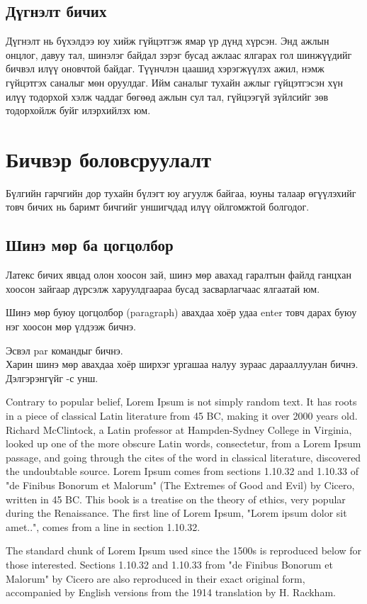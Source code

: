 \section{Дүгнэлт бичих}
Дүгнэлт нь бүхэлдээ юу хийж гүйцэтгэж ямар үр дүнд хүрсэн. Энд ажлын онцлог, давуу тал, шинэлэг байдал зэрэг бусад ажлаас ялгарах гол шинжүүдийг бичвэл илүү оновчтой байдаг. Түүнчлэн цаашид хэрэгжүүлэх ажил, нэмж гүйцэтгэх саналыг мөн оруулдаг. Ийм саналыг тухайн ажлыг гүйцэтгэсэн хүн илүү тодорхой хэлж чаддаг бөгөөд ажлын сул тал, гүйцээгүй зүйлсийг зөв тодорхойлж буйг илэрхийлэх юм.


\chapter{Бичвэр боловсруулалт}
Бүлгийн гарчгийн дор тухайн бүлэгт юу агуулж байгаа, юуны талаар өгүүлэхийг товч бичих нь баримт бичгийг уншигчдад илүү ойлгомжтой болгодог.
\section{Шинэ мөр ба цогцолбор}
Латекс бичих явцад олон хоосон зай, шинэ мөр авахад гаралтын файлд ганцхан хоосон зайгаар дүрсэлж харуулдгаараа бусад засварлагчаас ялгаатай юм.

Шинэ мөр буюу цогцолбор (paragraph) авахдаа хоёр удаа enter товч дарах буюу нэг хоосон мөр үлдээж бичнэ. \par Эсвэл par командыг бичнэ.
\\Харин шинэ мөр авахдаа хоёр ширхэг ургашаа налуу зураас дарааллуулан бичнэ.  Дэлгэрэнгүйг \cite{pharagraph1}-с унш.

Contrary to popular belief, Lorem Ipsum is not simply random text. It has roots in a piece of classical Latin literature from 45 BC, making it over 2000 years old. Richard McClintock, a Latin professor at Hampden-Sydney College in Virginia, looked up one of the more obscure Latin words, consectetur, from a Lorem Ipsum passage, and going through the cites of the word in classical literature, discovered the undoubtable source. Lorem Ipsum comes from sections 1.10.32 and 1.10.33 of "de Finibus Bonorum et Malorum" (The Extremes of Good and Evil) by Cicero, written in 45 BC. This book is a treatise on the theory of ethics, very popular during the Renaissance. The first line of Lorem Ipsum, "Lorem ipsum dolor sit amet..", comes from a line in section 1.10.32.

The standard chunk of Lorem Ipsum used since the 1500s is reproduced below for those interested. Sections 1.10.32 and 1.10.33 from "de Finibus Bonorum et Malorum" by Cicero are also reproduced in their exact original form, accompanied by English versions from the 1914 translation by H. Rackham.

